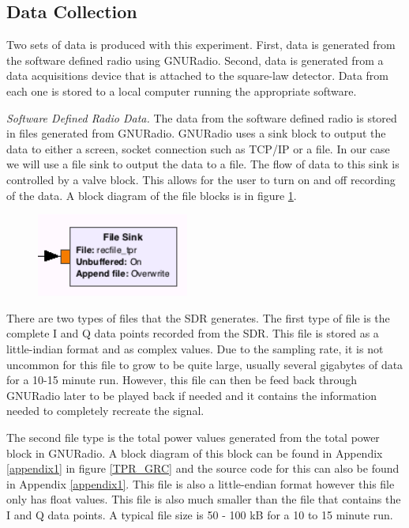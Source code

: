 \subsection{Data Collection}\label{exp1_data}

Two sets of data is produced with this experiment.  First, data is generated from the software defined radio using GNURadio.  Second, data is generated from a data acquisitions device that is attached to the square-law detector.  Data from each one is stored to a local computer running the appropriate software.

\emph{Software Defined Radio Data.  }The data from the software defined radio is stored in files generated from GNURadio.  GNURadio uses a sink block to output the data to either a screen, socket connection such as TCP/IP or a file.  In our case we will use a file sink to output the data to a file.  The flow of data to this sink is controlled by a valve block.  This allows for the user to turn on and off recording of the data.  A block diagram of the file blocks is in figure \ref{filesink}.

{\begin{figure}[h!tb] \centering
\includegraphics[width=5cm]{Images/TPR_Filesink.png}
\label{filesink}
\end{figure}
}

There are two types of files that the SDR generates.  The first type of file is the complete I and Q data points recorded from the SDR.  This file is stored as a little-indian format and as complex values.  Due to the sampling rate, it is not uncommon for this file to grow to be quite large, usually several gigabytes of data for a 10-15 minute run.  However, this file can then be feed back through GNURadio later to be played back if needed and it contains the information needed to completely recreate the signal.

The second file type is the total power values generated from the total power block in GNURadio.  A block diagram of this block can be found in Appendix \ref{appendix1} in figure \ref{TPR_GRC} and the source code for this can also be found in Appendix \ref{appendix1}.  This file is also a little-endian format however this file only has float values.  This file is also much smaller than the file that contains the I and Q data points.  A typical file size is 50 - 100 kB for a 10 to 15 minute run.  

